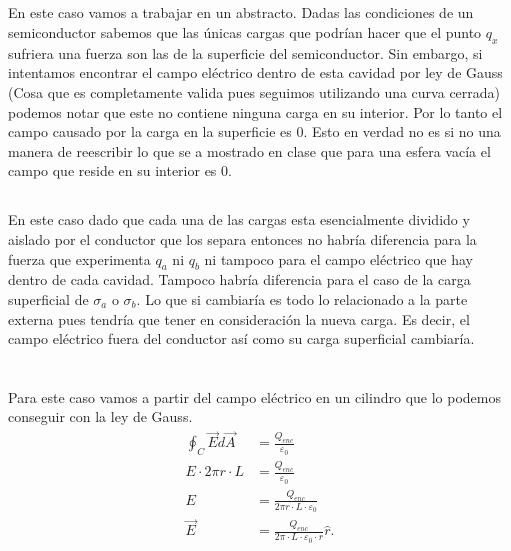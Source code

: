 \documentclass{report}
\begin{document}
\section{}

En este caso vamos a trabajar en un abstracto. Dadas las condiciones de un semiconductor sabemos que las únicas cargas que podrían hacer que el punto $q_x$ sufriera una fuerza son las de la superficie del semiconductor. Sin embargo, si intentamos encontrar el campo eléctrico dentro de esta cavidad por ley de Gauss (Cosa que es completamente valida pues seguimos utilizando una curva cerrada) podemos notar que este no contiene ninguna carga en su interior. Por lo tanto el campo causado por la carga en la superficie es 0. Esto en verdad no es si no una manera de reescribir lo que se a mostrado en clase que para una esfera vacía el campo que reside en su interior es 0.

\section{}

En este caso dado que cada una de las cargas esta esencialmente dividido y aislado por el conductor que los separa entonces no habría diferencia para la fuerza que experimenta $q_a$ ni $q_b$ ni tampoco para el campo eléctrico que hay dentro de cada cavidad. Tampoco habría diferencia para el caso de la carga superficial de $\sigma_a$ o $\sigma_b$. Lo que si cambiaría es todo lo relacionado a la parte externa pues tendría que tener en consideración la nueva carga. Es decir, el campo eléctrico fuera del conductor así como su carga superficial cambiaría.

\chapter{}

Para este caso vamos a partir del campo eléctrico en un cilindro que lo podemos conseguir con la ley de Gauss.
\begin{align*}
  \oint_{C} \vec{E} d\vec{A} &= \frac{Q_{enc}}{\varepsilon_0} \\
  E \cdot 2\pi r \cdot L &= \frac{Q_{enc}}{\varepsilon_0} \\
  E &= \frac{Q_{enc}}{2\pi r \cdot L \cdot \varepsilon_0} \\
  \vec{E} &= \frac{Q_{enc}}{2\pi\cdot L \cdot \varepsilon_0 \cdot r} \hat{r}
.\end{align*}
\end{document}
